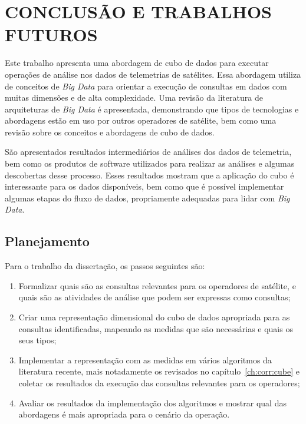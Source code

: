 
\chapter{CONCLUSÃO E TRABALHOS FUTUROS}
\label{ch:concl}

Este trabalho apresenta uma abordagem de cubo de dados para executar operações de análise nos dados de telemetrias de satélites.
Essa abordagem utiliza de conceitos de \textit{Big Data} para orientar a execução de consultas em dados com muitas dimensões e de alta complexidade.
Uma revisão da literatura de arquiteturas de \textit{Big Data} é apresentada, demonstrando que tipos de tecnologias e abordagens estão em uso por outros operadores de satélite, bem como uma revisão sobre os conceitos e abordagens de cubo de dados.

São apresentados resultados intermediários de análises dos dados de telemetria, bem como os produtos de software utilizados para realizar as análises e algumas descobertas desse processo.
Esses resultados mostram que a aplicação do cubo é interessante para os dados disponíveis, bem como que é possível implementar algumas etapas do fluxo de dados, propriamente adequadas para lidar com \textit{Big Data}.

\section{Planejamento}
\label{ch:concl:planning}

Para o trabalho da dissertação, os passos seguintes são:

\begin{enumerate}
\item Formalizar quais são as consultas relevantes para os operadores de satélite, e quais são as atividades de análise que podem ser expressas como consultas;
\item Criar uma representação dimensional do cubo de dados apropriada para as consultas identificadas, mapeando as medidas que são necessárias e quais os seus tipos;
\item Implementar a representação com as medidas em vários algoritmos da literatura recente, mais notadamente os revisados no capítulo~\ref{ch:corr:cube} e coletar os resultados da execução das consultas relevantes para os operadores;
\item Avaliar os resultados da implementação dos algoritmos e mostrar qual das abordagens é mais apropriada para o cenário da operação.
\end{enumerate}


